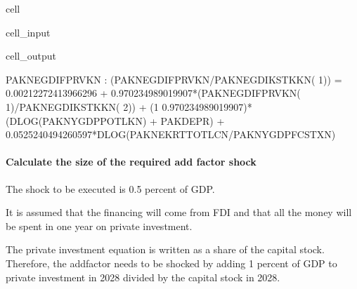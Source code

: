 \documentclass[letterpaper,10pt,english]{jupyterBook}
\begin{document}
\begin{sphinxuseclass}{cell}\begin{sphinxVerbatimInput}

\begin{sphinxuseclass}{cell_input}
\begin{sphinxVerbatim}[commandchars=\\\{\}]
\PYG{p}{[}\PYG{p}{]}
\end{sphinxVerbatim}

\end{sphinxuseclass}\end{sphinxVerbatimInput}
\begin{sphinxVerbatimOutput}

\begin{sphinxuseclass}{cell_output}
\begin{sphinxVerbatim}[commandchars=\\\{\}]
PAKNEGDIFPRVKN : (PAKNEGDIFPRVKN/PAKNEGDIKSTKKN( \PYGZhy{} 1)) = 0.00212272413966296 + 0.970234989019907*(PAKNEGDIFPRVKN( \PYGZhy{} 1)/PAKNEGDIKSTKKN( \PYGZhy{} 2)) + (1 \PYGZhy{} 0.970234989019907)*(DLOG(PAKNYGDPPOTLKN) + PAKDEPR) + 0.0525240494260597*DLOG(PAKNEKRTTOTLCN/PAKNYGDPFCSTXN)
\end{sphinxVerbatim}

\end{sphinxuseclass}\end{sphinxVerbatimOutput}

\end{sphinxuseclass}

\paragraph{Calculate the size of the required add factor shock}
\label{\detokenize{content/05_WBModels/ScenarioAnalysis:calculate-the-size-of-the-required-add-factor-shock}}
\sphinxAtStartPar
The shock to be executed is 0.5 percent of GDP.

\sphinxAtStartPar
It is assumed that the financing will come from FDI and that all the money will be spent in one year on private investment.

\sphinxAtStartPar
The private investment equation is written as a share of the capital stock.  Therefore, the add\sphinxhyphen{}factor needs to be shocked by adding 1 percent of GDP to private investment in 2028 divided by the capital stock in 2028.
\end{document}
